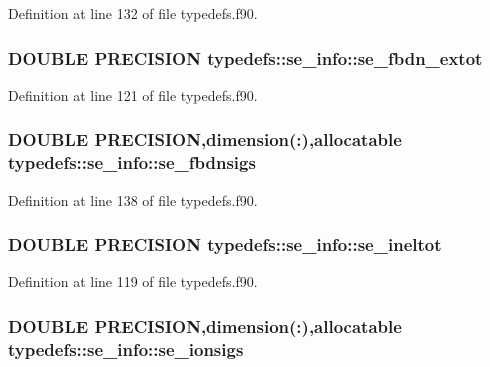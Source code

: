 Definition at line 132 of file typedefs.f90.\hypertarget{typetypedefs_1_1se__info_a83ca0f6f1df82c84b483903bf0744388}{
\subsubsection[{se\_\-fbdn\_\-extot}]{\setlength{\rightskip}{0pt plus 5cm}DOUBLE PRECISION {\bf typedefs::se\_\-info::se\_\-fbdn\_\-extot}}}
\label{typetypedefs_1_1se__info_a83ca0f6f1df82c84b483903bf0744388}


Definition at line 121 of file typedefs.f90.\hypertarget{typetypedefs_1_1se__info_a358b552703647e88a165b6523d1e4daa}{
\subsubsection[{se\_\-fbdnsigs}]{\setlength{\rightskip}{0pt plus 5cm}DOUBLE PRECISION,dimension(:),allocatable {\bf typedefs::se\_\-info::se\_\-fbdnsigs}}}
\label{typetypedefs_1_1se__info_a358b552703647e88a165b6523d1e4daa}


Definition at line 138 of file typedefs.f90.\hypertarget{typetypedefs_1_1se__info_a7be9da23a41fbccf4dc5c0d157ef63e9}{
\subsubsection[{se\_\-ineltot}]{\setlength{\rightskip}{0pt plus 5cm}DOUBLE PRECISION {\bf typedefs::se\_\-info::se\_\-ineltot}}}
\label{typetypedefs_1_1se__info_a7be9da23a41fbccf4dc5c0d157ef63e9}


Definition at line 119 of file typedefs.f90.\hypertarget{typetypedefs_1_1se__info_a22bb3ce5a09c2ad12c553e3b427ec812}{
\subsubsection[{se\_\-ionsigs}]{\setlength{\rightskip}{0pt plus 5cm}DOUBLE PRECISION,dimension(:),allocatable {\bf typedefs::se\_\-info::se\_\-ionsigs}}}
\label{typetypedefs_1_1se__info_a22bb3ce5a09c2ad12c553e3b427ec812}


